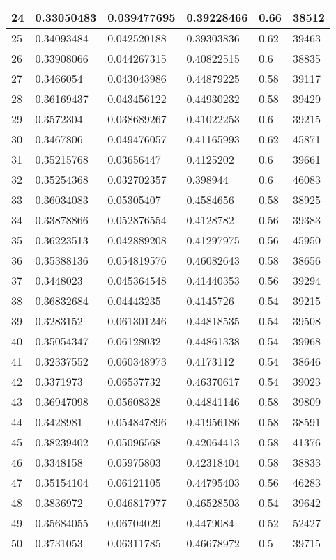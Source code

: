 \begin{longtable}{|l|l|l|l|l|l|}
24 & 0.33050483 & 0.039477695 & 0.39228466 & 0.66 & 38512 \\ \hline 
25 & 0.34093484 & 0.042520188 & 0.39303836 & 0.62 & 39463 \\ \hline 
26 & 0.33908066 & 0.044267315 & 0.40822515 & 0.6 & 38835 \\ \hline 
27 & 0.3466054 & 0.043043986 & 0.44879225 & 0.58 & 39117 \\ \hline 
28 & 0.36169437 & 0.043456122 & 0.44930232 & 0.58 & 39429 \\ \hline 
29 & 0.3572304 & 0.038689267 & 0.41022253 & 0.6 & 39215 \\ \hline 
30 & 0.3467806 & 0.049476057 & 0.41165993 & 0.62 & 45871 \\ \hline 
31 & 0.35215768 & 0.03656447 & 0.4125202 & 0.6 & 39661 \\ \hline 
32 & 0.35254368 & 0.032702357 & 0.398944 & 0.6 & 46083 \\ \hline 
33 & 0.36034083 & 0.05305407 & 0.4584656 & 0.58 & 38925 \\ \hline 
34 & 0.33878866 & 0.052876554 & 0.4128782 & 0.56 & 39383 \\ \hline 
35 & 0.36223513 & 0.042889208 & 0.41297975 & 0.56 & 45950 \\ \hline 
36 & 0.35388136 & 0.054819576 & 0.46082643 & 0.58 & 38656 \\ \hline 
37 & 0.3448023 & 0.045364548 & 0.41440353 & 0.56 & 39294 \\ \hline 
38 & 0.36832684 & 0.04443235 & 0.4145726 & 0.54 & 39215 \\ \hline 
39 & 0.3283152 & 0.061301246 & 0.44818535 & 0.54 & 39508 \\ \hline 
40 & 0.35054347 & 0.06128032 & 0.44861338 & 0.54 & 39968 \\ \hline 
41 & 0.32337552 & 0.060348973 & 0.4173112 & 0.54 & 38646 \\ \hline 
42 & 0.3371973 & 0.06537732 & 0.46370617 & 0.54 & 39023 \\ \hline 
43 & 0.36947098 & 0.05608328 & 0.44841146 & 0.58 & 39809 \\ \hline 
44 & 0.3428981 & 0.054847896 & 0.41956186 & 0.58 & 38591 \\ \hline 
45 & 0.38239402 & 0.05096568 & 0.42064413 & 0.58 & 41376 \\ \hline 
46 & 0.3348158 & 0.05975803 & 0.42318404 & 0.58 & 38833 \\ \hline 
47 & 0.35154104 & 0.06121105 & 0.44795403 & 0.56 & 46283 \\ \hline 
48 & 0.3836972 & 0.046817977 & 0.46528503 & 0.54 & 39642 \\ \hline 
49 & 0.35684055 & 0.06704029 & 0.4479084 & 0.52 & 52427 \\ \hline 
50 & 0.3731053 & 0.06311785 & 0.46678972 & 0.5 & 39715 \\ \hline 
\end{longtable}
